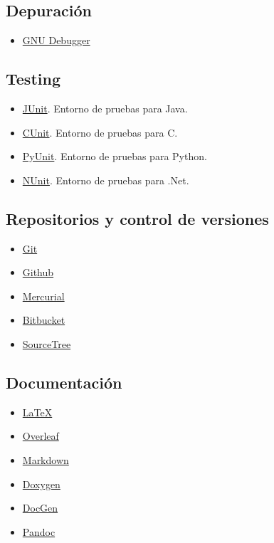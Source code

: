 \subsection{Depuración}
\begin{itemize}[nosep]
\item \href{https://www.gnu.org/s/gdb/}{GNU Debugger}
\end{itemize}

\subsection{Testing}
\begin{multicols}{2}
\begin{itemize}[nosep]
\item \href{http://junit.org}{JUnit}. Entorno de pruebas para Java.
\item \href{http://cunit.sourceforge.net/}{CUnit}. Entorno de pruebas para C.
\item \href{https://wiki.python.org/moin/PyUnit}{PyUnit}. Entorno de pruebas para Python.
\item \href{https://nunit.org/}{NUnit}. Entorno de pruebas para .Net.
\end{itemize}
\end{multicols}

\subsection{Repositorios y control de versiones}
\begin{multicols}{2}
\begin{itemize}[nosep]
\item \href{https://git-scm.com/}{Git}
\item \href{https://github.com/}{Github}
\item \href{https://www.mercurial-scm.org/}{Mercurial}
\item \href{https://bitbucket.org/}{Bitbucket}
\item \href{https://www.sourcetreeapp.com/}{SourceTree}
\end{itemize}
\end{multicols}


\subsection{Documentación}
\begin{multicols}{2}
\begin{itemize}[nosep]
\item \href{https://www.latex-project.org/}{\LaTeX}
\item \href{https://www.overleaf.com/}{Overleaf}
\item \href{https://markdown.es/}{Markdown}
\item \href{http://www.stack.nl/\%7Edimitri/doxygen/index.html}{Doxygen}
\item \href{http://mtmacdonald.github.io/docgen/docs/index.html}{DocGen}
\item \href{http://pandoc.org/}{Pandoc}
\end{itemize}
\end{multicols}


